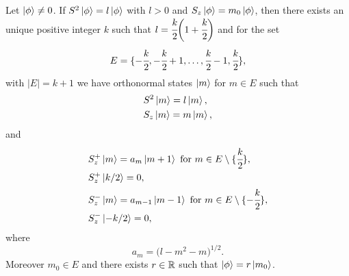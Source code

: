 \documentclass[main.tex]{subfiles}
\begin{document}
\begin{theorem}
\label{spin-matrix-representations}
Let $\ket{\phi}\not = 0$. 
If $S^2\ket{\phi} = l\ket{\phi}$ with $l > 0$ and $S_z\ket{\phi} = m_0\ket{\phi}$, then there exists an unique positive integer $k$ such that $l = \cfrac{k}{2}\bigg(1 + \cfrac{k}{2}\bigg)$ and for the set 
\begin{equation}
E = \{-\cfrac{k}{2}, -\cfrac{k}{2} + 1, \dots, \cfrac{k}{2} - 1, \cfrac{k}{2}\},   
\end{equation}
with $|E| = k + 1$ 
we have orthonormal states $\ket{m}$ for $m\in E$ such that
\begin{align}
& S^2 \ket{m} = l \ket{m}, \\
& S_z \ket{m} = m \ket{m},
\end{align}
and
\begin{align}
& S^{+}_z\ket{m} = a_m \ket{m + 1} \text{ for } m\in E\setminus\{\cfrac{k}{2}\},\\
& S^{+}_z\ket{k/2} = 0,\\
& S^{-}_z\ket{m} = a_{m-1} \ket{m - 1} \text{ for } m\in E\setminus\{-\cfrac{k}{2}\},\\
& S^{-}_z\ket{-k/2} = 0,
\end{align}
where
\begin{equation}
a_m = \bigg(l - m^2 - m\bigg)^{1/2}.
\end{equation}
Moreover $m_0\in E$ and there exists $r\in \mathbb{R}$ such that $\ket{\phi} = r\ket{m_0}$. 
\end{theorem}
\end{document}
